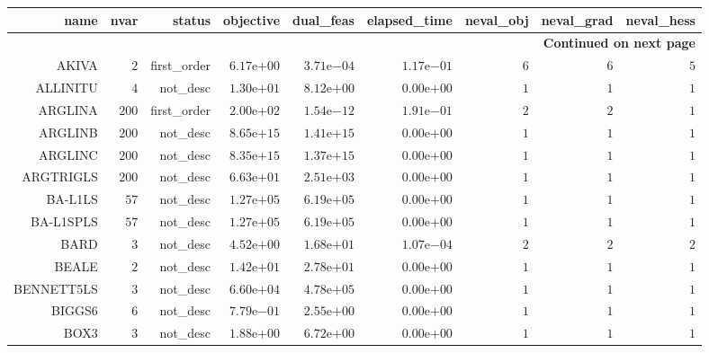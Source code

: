 \begin{longtable}{rrrrrrrrr}
\hline
name & nvar & status & objective & dual\_feas & elapsed\_time & neval\_obj & neval\_grad & neval\_hess \\\hline
\endhead
\hline
\multicolumn{9}{r}{{\bfseries Continued on next page}}\\
\hline
\endfoot
\endlastfoot
AKIVA & \(     2\) & first\_order & \( 6.17\)e\(+00\) & \( 3.71\)e\(-04\) & \( 1.17\)e\(-01\) & \(     6\) & \(     6\) & \(     5\) \\
ALLINITU & \(     4\) & not\_desc & \( 1.30\)e\(+01\) & \( 8.12\)e\(+00\) & \( 0.00\)e\(+00\) & \(     1\) & \(     1\) & \(     1\) \\
ARGLINA & \(   200\) & first\_order & \( 2.00\)e\(+02\) & \( 1.54\)e\(-12\) & \( 1.91\)e\(-01\) & \(     2\) & \(     2\) & \(     1\) \\
ARGLINB & \(   200\) & not\_desc & \( 8.65\)e\(+15\) & \( 1.41\)e\(+15\) & \( 0.00\)e\(+00\) & \(     1\) & \(     1\) & \(     1\) \\
ARGLINC & \(   200\) & not\_desc & \( 8.35\)e\(+15\) & \( 1.37\)e\(+15\) & \( 0.00\)e\(+00\) & \(     1\) & \(     1\) & \(     1\) \\
ARGTRIGLS & \(   200\) & not\_desc & \( 6.63\)e\(+01\) & \( 2.51\)e\(+03\) & \( 0.00\)e\(+00\) & \(     1\) & \(     1\) & \(     1\) \\
BA-L1LS & \(    57\) & not\_desc & \( 1.27\)e\(+05\) & \( 6.19\)e\(+05\) & \( 0.00\)e\(+00\) & \(     1\) & \(     1\) & \(     1\) \\
BA-L1SPLS & \(    57\) & not\_desc & \( 1.27\)e\(+05\) & \( 6.19\)e\(+05\) & \( 0.00\)e\(+00\) & \(     1\) & \(     1\) & \(     1\) \\
BARD & \(     3\) & not\_desc & \( 4.52\)e\(+00\) & \( 1.68\)e\(+01\) & \( 1.07\)e\(-04\) & \(     2\) & \(     2\) & \(     2\) \\
BEALE & \(     2\) & not\_desc & \( 1.42\)e\(+01\) & \( 2.78\)e\(+01\) & \( 0.00\)e\(+00\) & \(     1\) & \(     1\) & \(     1\) \\
BENNETT5LS & \(     3\) & not\_desc & \( 6.60\)e\(+04\) & \( 4.78\)e\(+05\) & \( 0.00\)e\(+00\) & \(     1\) & \(     1\) & \(     1\) \\
BIGGS6 & \(     6\) & not\_desc & \( 7.79\)e\(-01\) & \( 2.55\)e\(+00\) & \( 0.00\)e\(+00\) & \(     1\) & \(     1\) & \(     1\) \\
BOX3 & \(     3\) & not\_desc & \( 1.88\)e\(+00\) & \( 6.72\)e\(+00\) & \( 0.00\)e\(+00\) & \(     1\) & \(     1\) & \(     1\) \\

\end{longtable}
